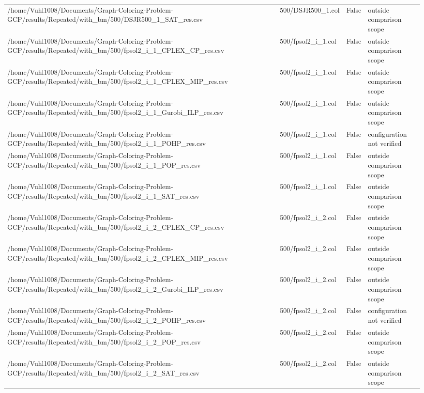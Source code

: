 \begin{table}[htbp]
\begin{tabular}{llll}
/home/Vuhl1008/Documents/Graph-Coloring-Problem-GCP/results/Repeated/with\_bm/500/DSJR500\_1\_SAT\_res.csv & 500/DSJR500\_1.col & False & outside comparison scope \\
/home/Vuhl1008/Documents/Graph-Coloring-Problem-GCP/results/Repeated/with\_bm/500/fpsol2\_i\_1\_CPLEX\_CP\_res.csv & 500/fpsol2\_i\_1.col & False & outside comparison scope \\
/home/Vuhl1008/Documents/Graph-Coloring-Problem-GCP/results/Repeated/with\_bm/500/fpsol2\_i\_1\_CPLEX\_MIP\_res.csv & 500/fpsol2\_i\_1.col & False & outside comparison scope \\
/home/Vuhl1008/Documents/Graph-Coloring-Problem-GCP/results/Repeated/with\_bm/500/fpsol2\_i\_1\_Gurobi\_ILP\_res.csv & 500/fpsol2\_i\_1.col & False & outside comparison scope \\
/home/Vuhl1008/Documents/Graph-Coloring-Problem-GCP/results/Repeated/with\_bm/500/fpsol2\_i\_1\_POHP\_res.csv & 500/fpsol2\_i\_1.col & False & configuration not verified \\
/home/Vuhl1008/Documents/Graph-Coloring-Problem-GCP/results/Repeated/with\_bm/500/fpsol2\_i\_1\_POP\_res.csv & 500/fpsol2\_i\_1.col & False & outside comparison scope \\
/home/Vuhl1008/Documents/Graph-Coloring-Problem-GCP/results/Repeated/with\_bm/500/fpsol2\_i\_1\_SAT\_res.csv & 500/fpsol2\_i\_1.col & False & outside comparison scope \\
/home/Vuhl1008/Documents/Graph-Coloring-Problem-GCP/results/Repeated/with\_bm/500/fpsol2\_i\_2\_CPLEX\_CP\_res.csv & 500/fpsol2\_i\_2.col & False & outside comparison scope \\
/home/Vuhl1008/Documents/Graph-Coloring-Problem-GCP/results/Repeated/with\_bm/500/fpsol2\_i\_2\_CPLEX\_MIP\_res.csv & 500/fpsol2\_i\_2.col & False & outside comparison scope \\
/home/Vuhl1008/Documents/Graph-Coloring-Problem-GCP/results/Repeated/with\_bm/500/fpsol2\_i\_2\_Gurobi\_ILP\_res.csv & 500/fpsol2\_i\_2.col & False & outside comparison scope \\
/home/Vuhl1008/Documents/Graph-Coloring-Problem-GCP/results/Repeated/with\_bm/500/fpsol2\_i\_2\_POHP\_res.csv & 500/fpsol2\_i\_2.col & False & configuration not verified \\
/home/Vuhl1008/Documents/Graph-Coloring-Problem-GCP/results/Repeated/with\_bm/500/fpsol2\_i\_2\_POP\_res.csv & 500/fpsol2\_i\_2.col & False & outside comparison scope \\
/home/Vuhl1008/Documents/Graph-Coloring-Problem-GCP/results/Repeated/with\_bm/500/fpsol2\_i\_2\_SAT\_res.csv & 500/fpsol2\_i\_2.col & False & outside comparison scope \\

\end{tabular}
\end{table}
